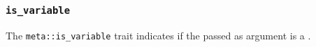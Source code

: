 
\subsubsection{\texttt{is\_variable}}

The \texttt{meta::is\_variable}
trait indicates if the  passed as argument is a .



